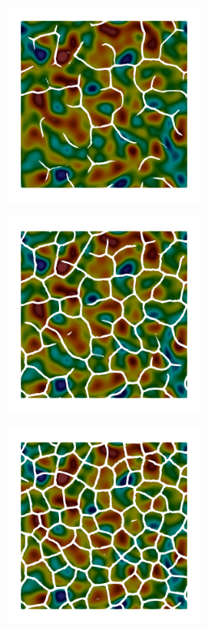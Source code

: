 \begin{figure}[!htbp]
    \begin{subfigure}[b]{0.25\textwidth}
        \includegraphics[width=0.7\textwidth]{past/figures/psic_sqexp_cartesian_5_5_rho_0_seed_a_with_crack_140.png}
    \end{subfigure}
    \begin{subfigure}[b]{0.25\textwidth}
        \includegraphics[width=0.7\textwidth]{past/figures/psic_sqexp_cartesian_5_5_rho_0_seed_a_with_crack_160.png}
    \end{subfigure}
    \begin{subfigure}[b]{0.25\textwidth}
        \includegraphics[width=0.7\textwidth]{past/figures/psic_sqexp_cartesian_5_5_rho_0_seed_a_with_crack_220.png}

\end{subfigure}
\end{figure}
